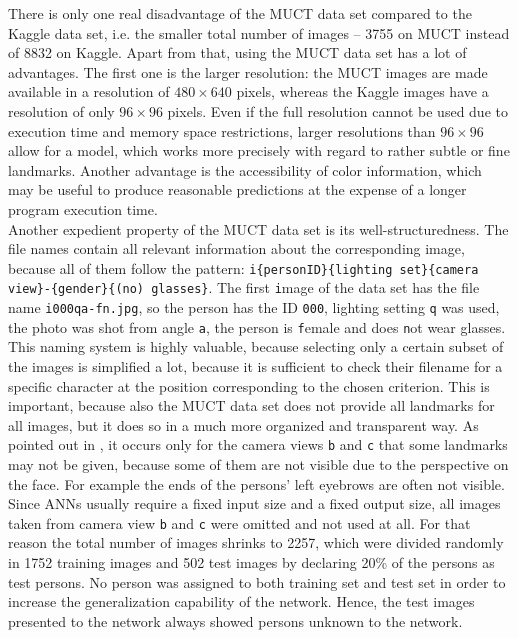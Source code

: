 \documentclass[11pt, a4paper]{article}
\begin{document}
\begin{itemize}
There is only one real disadvantage of the \ac{MUCT} data set compared to the Kaggle data set, i.e. the smaller total number of images -- 3755 on \ac{MUCT} instead of 8832 on Kaggle. Apart from that, using the \ac{MUCT} data set has a lot of advantages. The first one is the larger resolution: the \ac{MUCT} images are made available in a resolution of $480 \times 640$ pixels, whereas the Kaggle images have a resolution of only $96 \times 96$ pixels. Even if the full resolution cannot be used due to execution time and memory space restrictions, larger resolutions than $96 \times 96$ allow for a model, which works more precisely with regard to rather subtle or fine landmarks. Another advantage is the accessibility of color information, which may be useful to produce reasonable predictions at the expense of a longer program execution time.\\
Another expedient property of the \ac{MUCT} data set is its well-structuredness. The file names contain all relevant information about the corresponding image, because all of them follow the pattern: \texttt{i\{personID\}\{lighting set\}\{camera view\}-\{gender\}\{(no) glasses\}}. The first \texttt{i}mage of the data set has the file name \texttt{i000qa-fn.jpg}, so the person has the ID \texttt{000}, lighting setting \texttt{q} was used, the photo was shot from angle \texttt{a}, the person is \texttt{f}emale and does \texttt{n}ot wear glasses.\\
This naming system is highly valuable, because selecting only a certain subset of the images is simplified a lot, because it is sufficient to check their filename for a specific character at the position corresponding to the chosen criterion. This is important, because also the \ac{MUCT} data set does not provide all landmarks for all images, but it does so in a much more organized and transparent way. As pointed out in \cite{muct}, it occurs only for the camera views \texttt{b} and \texttt{c} that some landmarks may not be given, because some of them are not visible due to the perspective on the face. For example the ends of the persons' left eyebrows are often not visible.\\
Since \acp{ANN} usually require a fixed input size and a fixed output size, all images taken from camera view \texttt{b} and \texttt{c} were omitted and not used at all. For that reason the total number of images shrinks to 2257, which were divided randomly in 1752 training images and 502 test images by declaring 20\% of the persons as test persons. No person was assigned to both training set and test set in order to increase the generalization capability of the network. Hence, the test images presented to the network always showed persons unknown to the network.


\end{itemize}
\end{document}
